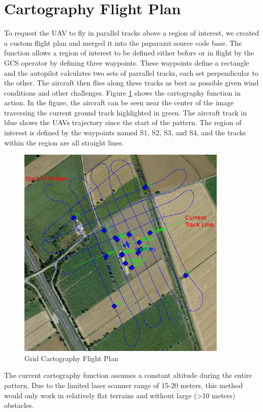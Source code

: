 \documentclass[a4paper,11pt]{report}
\begin{document}
\section{Cartography Flight Plan}

To request the UAV to fly in parallel tracks above a region of interest, we created a custom flight plan and merged it into the paparazzi source code base. The function allows a region of interest to be defined either before or in flight by the GCS operator by defining three waypoints. These waypoints define a rectangle and the autopilot calculates two sets of parrallel tracks, each set perpendicular to the other. The aircraft then flies along these tracks as best as possible given wind conditions and other challenges. Figure \ref{fig:gridcarto} shows the cartography function in action. In the figure, the aircraft can be seen near the center of the image traversing the current ground track highlighted in green. The aircraft track in blue shows the UAVs trajectory since the start of the pattern. The region of interest is defined by the waypoints named S1, S2, S3, and S4, and the tracks within the region are all straight lines.

\begin{figure}[ht]
 \centering
 \includegraphics[width=10cm]{pprz_cartography.png}
 \caption{Grid Cartography Flight Plan}
 \label{fig:gridcarto}
\end{figure}

The current cartography function assumes a constant altitude during the entire pattern. Due to the limited laser scanner range of 15-20 meters, this method would only work in relatively flat terrains and without large (>10 meters) obstacles.
\end{document}
